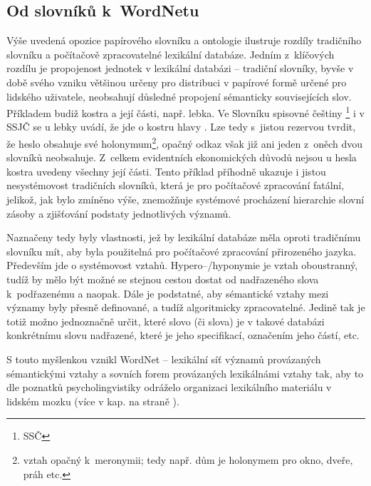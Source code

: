\documentclass[a4paper, 11pt, oneside, showtrims]{book}
\newcommand{\td}[2][]{
	{\hskip -0.5em\todo[size=\footnotesize]{#2}}
}
\newcommand{\itNameRef}[1]{\textit{\nameref{#1}}}
\newcommand\ex{\textsf}
\begin{document}
				\subsection{Od slovníků k~WordNetu}

					Výše uvedená opozice papírového slovníku a ontologie ilustruje rozdíly tradičního slovníku a počítačově zpracovatelné lexikální databáze. Jedním z~klíčových rozdílu je propojenost jednotek v lexikální databázi -- tradiční slovníky, byvše v době svého vzniku většinou určeny pro distribuci v papírové formě určené pro lidského uživatele, neobsahují důsledné propojení sémanticky souvisejících slov. Příkladem budiž \ex{kostra} a její části, např. \ex{lebka}. Ve Slovníku spisovné češtiny \footnote{SSČ} i v SSJČ se u \ex{lebky} uvádí, že jde o \ex{kostru hlavy} \parencite{Havranek1989, filipec2005}. Lze tedy s~jistou rezervou tvrdit, že heslo obsahuje své holonymum\footnote{vztah opačný k~meronymii; tedy např. \ex{dům} je holonymem pro \ex{okno}, \ex{dveře}, \ex{práh} etc.}, opačný odkaz však již ani jeden z~oněch dvou slovníků neobsahuje. Z~celkem evidentních ekonomických důvodů nejsou u hesla \ex{kostra} uvedeny všechny její části. Tento příklad příhodně ukazuje i jistou nesystémovost tradičních slovníků, která je pro počítačové zpracování fatální, jelikož, jak bylo zmíněno výše, znemožňuje systémové procházení hierarchie slovní zásoby a zjišťování podstaty jednotlivých významů.

					Naznačeny tedy byly vlastnosti, jež by lexikální databáze měla oproti tradičnímu slovníku mít, aby byla použitelná pro počítačové zpracování přirozeného jazyka. Především jde o systémovost vztahů. Hypero--/hyponymie je vztah oboustranný, tudíž by mělo být možné se stejnou cestou dostat od nadřazeného slova k~podřazenému a naopak. Dále je podstatné, aby sémantické vztahy mezi významy byly přesně definované, a tudíž algoritmicky zpracovatelné. Jedině tak je totiž možno jednoznačně určit, které slovo (či slova) je v takové databázi konkrétnímu slovu nadřazené, které je jeho specifikací, označením jeho částí, etc. 

					S touto myšlenkou vznikl WordNet -- lexikální síť významů provázaných sémantickými vztahy a sovních forem provázaných lexikálnámi vztahy tak, aby to dle poznatků psycholingvistiky odráželo organizaci lexikálního materiálu v lidském mozku (více v kap. \itNameRef{cha:psycho} na straně \pageref{cha:psycho}). \parencite{pala2013vceska} 

\end{document}
